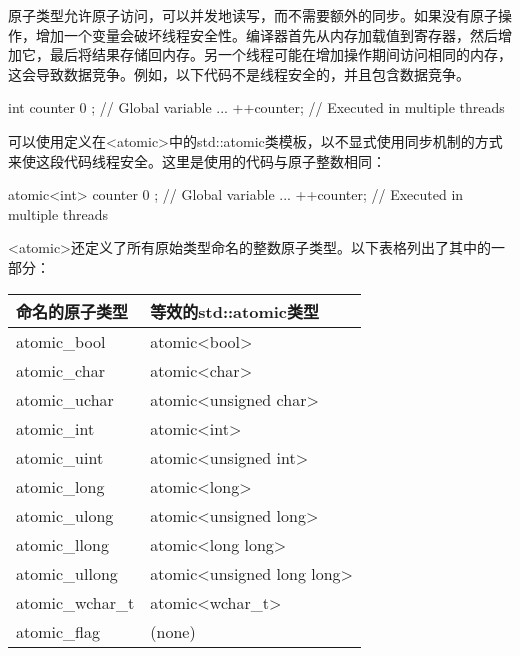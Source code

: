 
原子类型允许原子访问，可以并发地读写，而不需要额外的同步。如果没有原子操作，增加一个变量会破坏线程安全性。编译器首先从内存加载值到寄存器，然后增加它，最后将结果存储回内存。另一个线程可能在增加操作期间访问相同的内存，这会导致数据竞争。例如，以下代码不是线程安全的，并且包含数据竞争。

\begin{cpp}
int counter { 0 }; // Global variable
...
++counter; // Executed in multiple threads
\end{cpp}

可以使用定义在<atomic>中的std::atomic类模板，以不显式使用同步机制的方式来使这段代码线程安全。这里是使用的代码与原子整数相同：

\begin{cpp}
atomic<int> counter { 0 } ; // Global variable
...
++counter; // Executed in multiple threads
\end{cpp}

<atomic>还定义了所有原始类型命名的整数原子类型。以下表格列出了其中的一部分：

\begin{longtable}{|l|l|}
\hline
\textbf{命名的原子类型} & \textbf{等效的std::atomic类型}              \\ \hline
\endfirsthead
%
\endhead
%
atomic\_bool               & atomic\textless{}bool\textgreater{}               \\ \hline
atomic\_char               & atomic\textless{}char\textgreater{}               \\ \hline
atomic\_uchar              & atomic\textless{}unsigned char\textgreater{}      \\ \hline
atomic\_int                & atomic\textless{}int\textgreater{}                \\ \hline
atomic\_uint               & atomic\textless{}unsigned int\textgreater{}       \\ \hline
atomic\_long               & atomic\textless{}long\textgreater{}               \\ \hline
atomic\_ulong              & atomic\textless{}unsigned long\textgreater{}      \\ \hline
atomic\_llong              & atomic\textless{}long long\textgreater{}          \\ \hline
atomic\_ullong             & atomic\textless{}unsigned long long\textgreater{} \\ \hline
atomic\_wchar\_t           & atomic\textless{}wchar\_t\textgreater{}           \\ \hline
atomic\_flag               & (none)                                            \\ \hline
\end{longtable}

